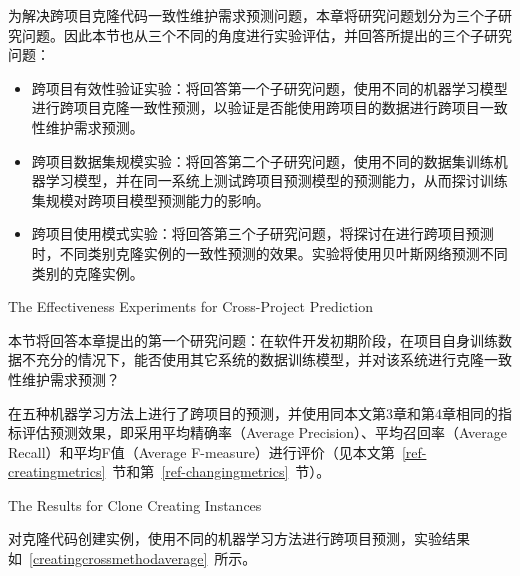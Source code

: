为解决跨项目克隆代码一致性维护需求预测问题，本章将研究问题划分为三个子研究问题。因此本节也从三个不同的角度进行实验评估，并回答所提出的三个子研究问题：
\begin{itemize}
\item
跨项目有效性验证实验：将回答第一个子研究问题，使用不同的机器学习模型进行跨项目克隆一致性预测，以验证是否能使用跨项目的数据进行跨项目一致性维护需求预测。
\item
跨项目数据集规模实验：将回答第二个子研究问题，使用不同的数据集训练机器学习模型，并在同一系统上测试跨项目预测模型的预测能力，从而探讨训练集规模对跨项目模型预测能力的影响。
\item
跨项目使用模式实验：将回答第三个子研究问题，将探讨在进行跨项目预测时，不同类别克隆实例的一致性预测的效果。实验将使用贝叶斯网络预测不同类别的克隆实例。
\end{itemize}

{The Effectiveness Experiments for Cross-Project Prediction}

本节将回答本章提出的第一个研究问题：在软件开发初期阶段，在项目自身训练数据不充分的情况下，能否使用其它系统的数据训练模型，并对该系统进行克隆一致性维护需求预测？

在五种机器学习方法上进行了跨项目的预测，并使用同本文第3章和第4章相同的指标评估预测效果，即采用平均精确率（Average Precision）、平均召回率（Average Recall）和平均F值（Average F-measure）进行评价（见本文第~\ref{ref-creatingmetrics}~节和第~\ref{ref-changingmetrics}~节）。

{The Results for Clone Creating Instances}

对克隆代码创建实例，使用不同的机器学习方法进行跨项目预测，实验结果如~\ref{creatingcrossmethodaverage}~所示。

